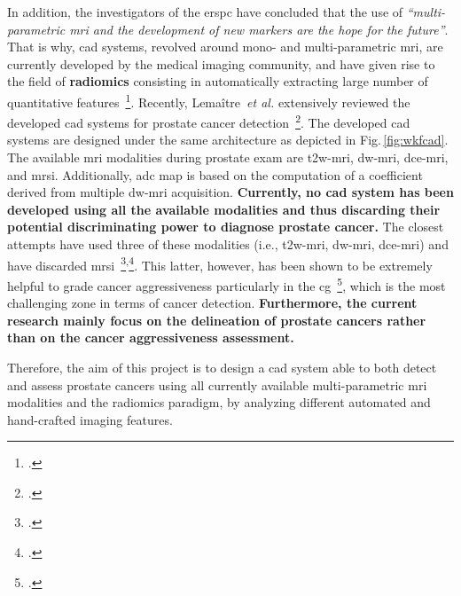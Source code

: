 In addition, the investigators of the \ac{erspc} have concluded that the use of \emph{``multi-parametric \ac{mri} and the development of new markers are the hope for the future''}.
That is why, \ac{cad} systems, revolved around mono- and multi-parametric \ac{mri}, are currently developed by the medical imaging community, and have given rise to the field of \textbf{radiomics} consisting in automatically extracting large number of quantitative features~\footcite{lambin2012radiomics}.
Recently, Lema\^itre~\emph{et al.} extensively reviewed the developed \ac{cad} systems for prostate cancer detection~\footcite{Lemaitre2015}.
The developed \ac{cad} systems are designed under the same architecture as depicted in Fig.\,\ref{fig:wkfcad}. 
The available \ac{mri} modalities during prostate exam are \ac{t2w}-\ac{mri}, \ac{dw}-\ac{mri}, \ac{dce}-\ac{mri}, and \ac{mrsi}. 
Additionally, \ac{adc} map is based on the computation of a coefficient derived from multiple \ac{dw}-\ac{mri} acquisition.
\textbf{Currently, no \ac{cad} system has been developed using all the available modalities and thus discarding their potential discriminating power to diagnose prostate cancer.}
The closest attempts have used three of these modalities (i.e., \ac{t2w}-\ac{mri}, \ac{dw}-\ac{mri}, \ac{dce}-\ac{mri}) and have discarded \ac{mrsi}~\footcite{Litjens2014}\textsuperscript{,}\footcite{Viswanath2011}.
This latter, however, has been shown to be extremely helpful to grade cancer aggressiveness particularly in the \ac{cg}~\footcite{Vos2015}, which is the most challenging zone in terms of cancer detection.
\textbf{Furthermore, the current research mainly focus on the delineation of prostate cancers rather than on the cancer aggressiveness assessment.}



Therefore, the aim of this project is to design a \ac{cad} system able to both detect and assess prostate cancers using all currently available multi-parametric \ac{mri} modalities and the radiomics paradigm, by analyzing different automated and hand-crafted imaging features.

